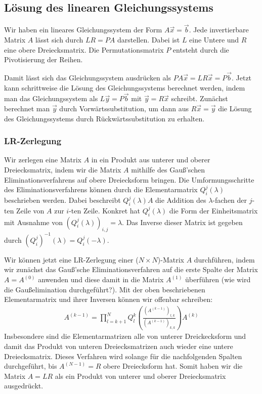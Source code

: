 \documentclass[10pt,a4paper]{article}
\begin{document}
\subsection{Lösung des linearen Gleichungssystems}
Wir haben ein lineares Gleichungssystem der Form $A\vec{x} = \vec{b}$. Jede invertierbare Matrix $A$ lässt sich durch $LR = PA$ darstellen. Dabei ist $L$ eine Untere und $R$ eine obere Dreiecksmatrix. Die Permutationsmatrix $P$ entsteht durch die Pivotisierung der Reihen.

Damit lässt sich das Gleichungssystem ausdrücken als $PA\vec{x} = LR\vec{x} = P\vec{b}$. Jetzt kann schrittweise die Lösung des Gleichungssystems berechnet werden, indem man das Gleichungssystem als $L\vec{y} = P\vec{b}$ mit $\vec{y} = R\vec{x}$ schreibt. Zunächst berechnet man $\vec{y}$ durch Vorwärtssubstitution, um dann aus $R\vec{x} = \vec{y}$ die Lösung des Gleichungssystems durch Rückwärtssubstitution zu erhalten.

\subsubsection{LR-Zerlegung}
Wir zerlegen eine Matrix $A$ in ein Produkt aus unterer und oberer Dreiecksmatrix, indem wir die Matrix $A$ mithilfe des Gauß'schen Eliminationsverfahrens auf obere Dreiecksform bringen. Die Umformungsschritte des Eliminationsverfahrens können durch die Elementarmatrix $Q^j_i(\lambda)$ beschrieben werden. Dabei beschreibt $Q^j_i (\lambda) A$ die Addition des $\lambda$-fachen der $j$-ten Zeile von $A$ zur $i$-ten Zeile. Konkret hat $Q^j_i (\lambda)$ die Form der Einheitsmatrix mit Ausnahme von $\left(Q^j_i (\lambda) \right)_{i, j} = \lambda$. Das Inverse dieser Matrix ist gegeben durch $\left( Q^j_i\right) ^{-1} (\lambda) = Q^j_i (-\lambda)$.

Wir können jetzt eine LR-Zerlegung einer ($N \times N$)-Matrix $A$ durchführen, indem wir zunächst das Gauß'sche Eliminationsverfahren auf die erste Spalte der Matrix $A = A^{(0)}$ anwenden und diese damit in die Matrix $A^{(1)}$ überführen (wie wird die Gaußelimination durchgeführt?). Mit der oben beschriebenen Elementarmatrix und ihrer Inversen können wir offenbar schreiben:
\begin{align}
	A^{(k-1)} = \prod_{l=k+1}^N Q^{k}_l \left( \frac{(A^{(k-1)})_{l,k}}{(A^{(k-1)})_{k,k}}\right)  A^{(k)}
\end{align}
Insbesondere sind die Elementarmatrizen alle von unterer Dreickecksform und damit das Produkt von unteren Dreiecksmatrizen auch wieder eine untere Dreiecksmatrix. Dieses Verfahren wird solange für die nachfolgenden Spalten durchgeführt, bis $A^{(N-1)} = R$ obere Dreiecksform hat. Somit haben wir die Matrix $A = L R$ als ein Produkt von unterer und oberer Dreiecksmatrix ausgedrückt. 
\end{document}
